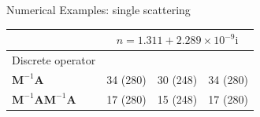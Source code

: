 \documentclass[12pt]{beamer}
\begin{document}
\begin{frame}{Numerical Examples: single scattering}
\begin{footnotesize}
\begin{table}[t!]
\centering
\begin{tabular}{lrrr}
\toprule
& \multicolumn{3}{c}{$n=1.311 + 2.289 \times 10^{-9}\mathrm{i}$} \\
\midrule
Discrete operator   &   &  & \\
$\mathbf{M}^{-1} \mathbf{A}$ & 34 (280) & 30 (248) & 34 (280)\\
$\mathbf{M}^{-1} \mathbf{A}\mathbf{M}^{-1} \mathbf{A}$ &17 (280) &15 (248) &17 (280)\\
\bottomrule
\end{tabular}
\end{table}
\end{footnotesize}
\end{frame}
\end{document}
